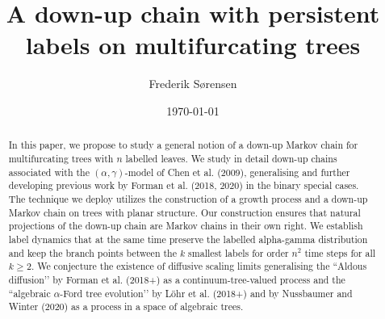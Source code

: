\documentclass[a4paper, final]{amsart}
\theoremstyle{plain}
\theoremstyle{definition}
\begin{document}
\title{A down-up chain with persistent labels on multifurcating trees}

\address{\hspace{-0.42cm}Frederik~S{\o}rensen\\ Department of Statistics\\ University of Oxford\\ 24--29 St Giles'\\ Oxford OX1 3LB, UK\\ Email: frederik.soerensen@seh.ox.ac.uk}             

\author{Frederik S{\o}rensen}    



\date{\today}

\begin{abstract}
  In this paper, we propose to study a general notion of a down-up Markov chain for multifurcating trees with $n$ labelled leaves.
  We study in detail down-up chains associated with the $(\alpha, \gamma)$-model of Chen et al. (2009), generalising and further developing previous work by Forman et al. (2018, 2020) in the binary special cases.
  The technique we deploy utilizes the construction of a growth process and a down-up Markov chain on trees with planar structure.
  Our construction ensures that natural projections of the down-up chain are Markov chains in their own right.
  We establish label dynamics that at the same time preserve the labelled alpha-gamma distribution and keep the branch points between the $k$ smallest labels for order $n^2$ time steps for all $k \geq 2$.
  We conjecture the existence of diffusive scaling limits generalising the ``Aldous diffusion’’ by Forman et al. (2018+) as a continuum-tree-valued process and the ``algebraic $\alpha$-Ford tree evolution’’ by L\"{o}hr et al. (2018+) and by Nussbaumer and Winter (2020) as a process in a space of algebraic trees.
\end{abstract}

\ \vspace{-24pt}

\maketitle
\end{document}
